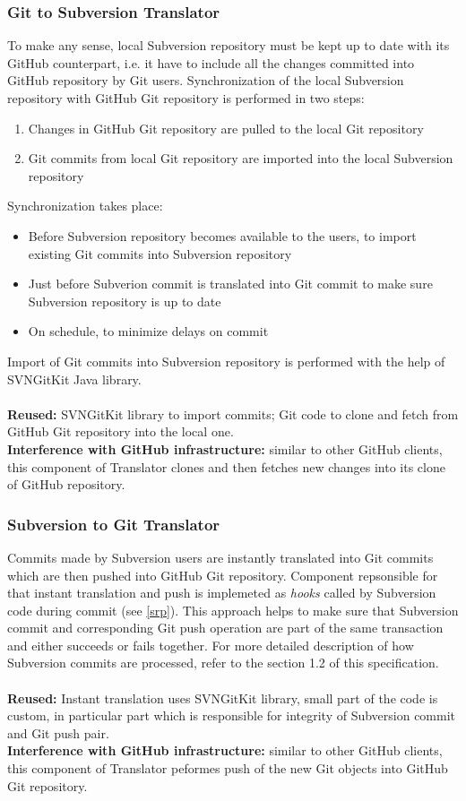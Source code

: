 \subsubsection{Git to Subversion Translator}
To make any sense, local Subversion repository must be kept up to date with its GitHub counterpart, i.e. it have to include all the changes committed into GitHub repository by Git users. Synchronization of the local Subversion repository with GitHub Git repository is performed in two steps:
\begin{enumerate}
\compactlist
\item Changes in GitHub Git repository are pulled to the local Git repository
\item Git commits from local Git repository are imported into the local Subversion repository
\end{enumerate} 
Synchronization takes place:
\begin{itemize}
\item Before Subversion repository becomes available to the users, to import existing Git commits into Subversion repository
\item Just before Subverion commit is translated into Git commit to make sure Subversion repository is up to date
\item On schedule, to minimize delays on commit
\end{itemize} 
Import of Git commits into Subversion repository is performed with the help of SVNGitKit Java library.
\\\\
\textbf{Reused:} SVNGitKit library to import commits; Git code to clone and fetch from GitHub Git repository into the local one.\\
\textbf{Interference with GitHub infrastructure:} similar to other GitHub clients, this component of Translator clones and then fetches new changes into its clone of GitHub repository.

\subsubsection{Subversion to Git Translator}
Commits made by Subversion users are instantly translated into Git commits which are then pushed into GitHub Git repository. Component repsonsible 
for that instant translation and push is implemeted as \emph{hooks} called by Subversion code during commit (see \ref{srp}).
\newpage 
This approach helps to make sure that Subversion commit and corresponding Git push operation are part of the same transaction and either succeeds or fails together.
For more detailed description of how Subversion commits are processed, refer to the section 1.2 of this specification.
\\\\
\textbf{Reused:} Instant translation uses SVNGitKit library, small part of the code is custom, in particular part which is responsible for integrity of Subversion commit and Git push pair.\\
\textbf{Interference with GitHub infrastructure:} similar to other GitHub clients, this component of Translator peformes push of the new Git objects into GitHub Git repository.

